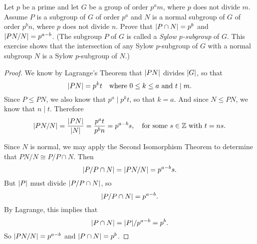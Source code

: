  Let $p$ be a prime and let $G$ be a group of order $p^am$,
where $p$ does not divide $m$. Assume $P$ is a subgroup of $G$ of
order $p^a$ and $N$ is a normal subgroup of $G$ of order $p^bn$, where
$p$ does not divide $n$. Prove that $\lvert{P\cap N}\rvert = p^b$ and
$\lvert{PN/N}\rvert = p^{a-b}$. (The subgroup $P$ of $G$ is called a {\em
  Sylow $p$-subgroup} of $G$. This exercise shows that the
intersection of any Sylow $p$-subgroup of $G$ with a normal subgroup
$N$ is a Sylow $p$-subgroup of $N$.)
\begin{proof}
  We know by Lagrange's Theorem that $\lvert{PN}\rvert$ divides $\lvert{G}\rvert$, so
  that
  \begin{equation*}
    \lvert{PN}\rvert = p^kt
    \quad\text{where $0\leq k\leq a$ and $t\mid m$}.
  \end{equation*}
  Since $P\leq PN$, we also know that $p^a\mid p^kt$, so that $k =
  a$. And since $N\leq PN$, we know that $n\mid t$. Therefore
  \begin{equation*}
    \lvert{PN/N}\rvert
    = \frac{\lvert{PN}\rvert}{\lvert{N}\rvert}
    = \frac{p^at}{p^bn}
    = p^{a-b}s,
    \quad
    \text{for some $s\in\mathbb{Z}$ with $t = ns$}.
  \end{equation*}

  Since $N$ is normal, we may apply the Second Isomorphism Theorem to
  determine that $PN/N\cong P/P\cap N$. Then
  \begin{equation*}
    \lvert{P/P\cap N}\rvert
    = \lvert{PN/N}\rvert
    = p^{a-b}s.
  \end{equation*}
  But $\lvert{P}\rvert$ must divide $\lvert{P/P\cap N}\rvert$, so
  \begin{equation*}
    \lvert{P/P\cap N}\rvert = p^{a-b}.
  \end{equation*}
  By Lagrange, this implies that
  \begin{equation*}
    \lvert{P\cap N}\rvert = \lvert{P}\rvert/p^{a-b} = p^b.
  \end{equation*}
  So $\lvert{PN/N}\rvert = p^{a-b}$ and $\lvert{P\cap N}\rvert = p^b$.
\end{proof}
